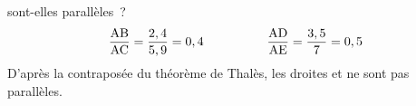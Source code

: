 \documentclass{thecours}
\begin{document}
     sont-elles parallèles~?\vskip5pt
    $$\dfrac{\text{AB}}{\text{AC}}=\dfrac{2,4}{5,9}=0,4\hskip50pt
    \dfrac{\text{AD}}{\text{AE}}=\dfrac{3,5}{7}=0,5$$\vskip5pt\noindent
    D'après la contraposée du théorème de Thalès, les droites 
    et  ne sont pas parallèles.
\end{document}
